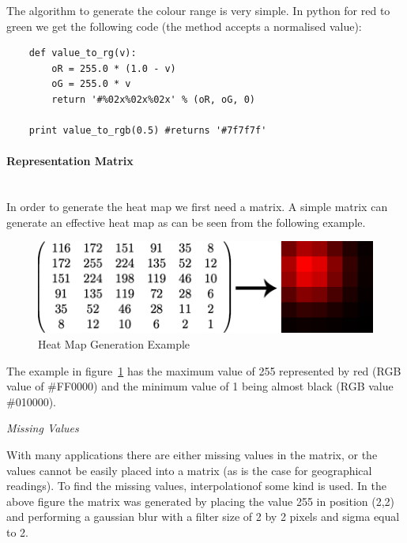 The algorithm to generate the colour range is very simple. In python for red to green we get the following code (the method accepts a normalised value):


\begin{verbatim}	
	def value_to_rg(v):
	    oR = 255.0 * (1.0 - v)
	    oG = 255.0 * v
	    return '#%02x%02x%02x' % (oR, oG, 0)
	    
	print value_to_rgb(0.5) #returns '#7f7f7f'
\end{verbatim}


\paragraph{Representation Matrix} \hspace{0pt} \\

In order to generate the heat map we first need a matrix. A simple matrix can generate an effective heat map as can be seen from the following example.

\begin{figure}[H]
        \begin{center}
                \includegraphics[scale=0.5]{./images/heatmaps/HeatMapGaussianExample.png}
                \caption{Heat Map Generation Example}
                \label{fig:matrixheatmapexample}
        \end{center}
\end{figure}

The example in figure~\ref{fig:matrixheatmapexample} has the maximum value of 255 represented by red (RGB value of \#FF0000) and the minimum value of 1 being almost black (RGB value \#010000). 

\emph{Missing Values}

With many applications there are either missing values in the matrix, or the values cannot be easily placed into a matrix (as is the case for geographical readings). To find the missing values, interpolationof some kind is used. In the above figure the matrix was generated by placing the value 255 in position (2,2) and performing a gaussian blur with a filter size of 2 by 2 pixels and sigma equal to 2. 

